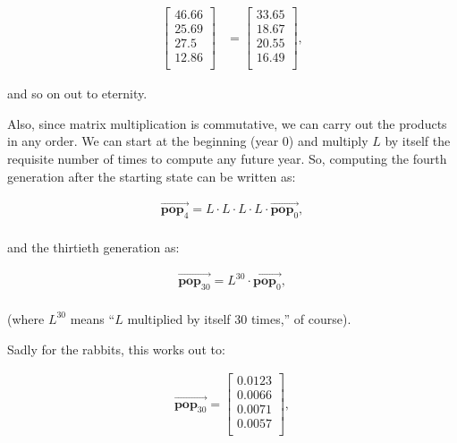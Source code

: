 \begin{alttitles}
\begin{align*}
\begin{bmatrix}
46.66 \\ 25.69 \\ 27.5 \\ 12.86 \\
\end{bmatrix} &=
\begin{bmatrix}
33.65 \\ 18.67 \\ 20.55 \\ 16.49 \\
\end{bmatrix},
\end{align*}
\vspace{-.15in}

and so on out to eternity.

\smallskip


Also, since matrix multiplication is commutative, we can carry out the products
in any order. We can start at the beginning (year 0) and multiply $L$ by itself
the requisite number of times to compute any future year. So, computing the
fourth generation after the starting state can be written as:

\vspace{-.15in}
\begin{align*}
\overrightarrow{\textbf{pop}_4} = L \cdot L \cdot L \cdot L \cdot
\overrightarrow{\textbf{pop}_0}, \\
\end{align*}
\vspace{-.45in}

and the thirtieth generation as:

\vspace{-.15in}
\begin{align*}
\overrightarrow{\textbf{pop}_{30}} = L^{30} \cdot
\overrightarrow{\textbf{pop}_0},\\
\end{align*}
\vspace{-.45in}

(where $L^{30}$ means ``$L$ multiplied by itself 30 times,'' of course).

\bigskip

Sadly for the rabbits, this works out to:

\vspace{-.15in}
\begin{align*}
\overrightarrow{\textbf{pop}_{30}} = 
\begin{bmatrix}
0.0123 \\ 0.0066 \\ 0.0071 \\ 0.0057 \\
\end{bmatrix},\\
\end{align*}
\vspace{-.45in}


\end{alttitles}

